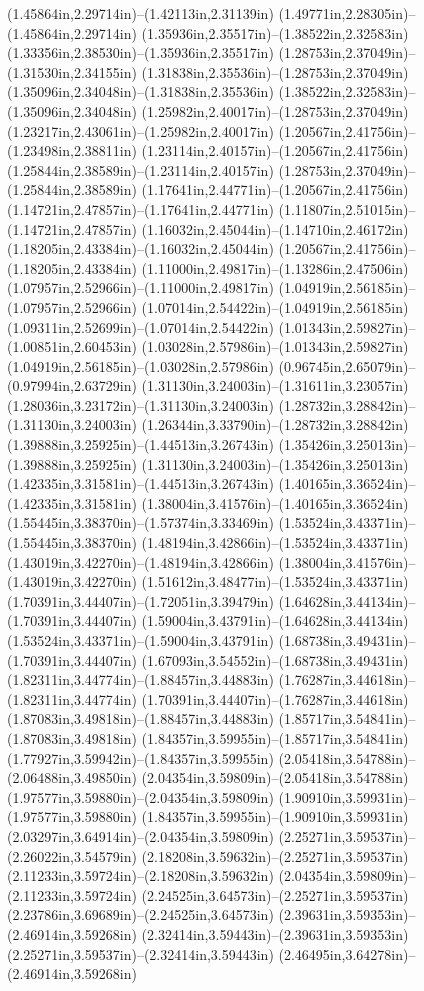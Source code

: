 (1.45864in,2.29714in)--(1.42113in,2.31139in) (1.49771in,2.28305in)--(1.45864in,2.29714in) (1.35936in,2.35517in)--(1.38522in,2.32583in) (1.33356in,2.38530in)--(1.35936in,2.35517in) (1.28753in,2.37049in)--(1.31530in,2.34155in) (1.31838in,2.35536in)--(1.28753in,2.37049in) (1.35096in,2.34048in)--(1.31838in,2.35536in) (1.38522in,2.32583in)--(1.35096in,2.34048in) (1.25982in,2.40017in)--(1.28753in,2.37049in) (1.23217in,2.43061in)--(1.25982in,2.40017in) (1.20567in,2.41756in)--(1.23498in,2.38811in) (1.23114in,2.40157in)--(1.20567in,2.41756in) (1.25844in,2.38589in)--(1.23114in,2.40157in) (1.28753in,2.37049in)--(1.25844in,2.38589in) (1.17641in,2.44771in)--(1.20567in,2.41756in) (1.14721in,2.47857in)--(1.17641in,2.44771in) (1.11807in,2.51015in)--(1.14721in,2.47857in) (1.16032in,2.45044in)--(1.14710in,2.46172in) (1.18205in,2.43384in)--(1.16032in,2.45044in) (1.20567in,2.41756in)--(1.18205in,2.43384in) (1.11000in,2.49817in)--(1.13286in,2.47506in) (1.07957in,2.52966in)--(1.11000in,2.49817in) (1.04919in,2.56185in)--(1.07957in,2.52966in) (1.07014in,2.54422in)--(1.04919in,2.56185in) (1.09311in,2.52699in)--(1.07014in,2.54422in) (1.01343in,2.59827in)--(1.00851in,2.60453in) (1.03028in,2.57986in)--(1.01343in,2.59827in) (1.04919in,2.56185in)--(1.03028in,2.57986in) (0.96745in,2.65079in)--(0.97994in,2.63729in) (1.31130in,3.24003in)--(1.31611in,3.23057in) (1.28036in,3.23172in)--(1.31130in,3.24003in) (1.28732in,3.28842in)--(1.31130in,3.24003in) (1.26344in,3.33790in)--(1.28732in,3.28842in) (1.39888in,3.25925in)--(1.44513in,3.26743in) (1.35426in,3.25013in)--(1.39888in,3.25925in) (1.31130in,3.24003in)--(1.35426in,3.25013in) (1.42335in,3.31581in)--(1.44513in,3.26743in) (1.40165in,3.36524in)--(1.42335in,3.31581in) (1.38004in,3.41576in)--(1.40165in,3.36524in) (1.55445in,3.38370in)--(1.57374in,3.33469in) (1.53524in,3.43371in)--(1.55445in,3.38370in) (1.48194in,3.42866in)--(1.53524in,3.43371in) (1.43019in,3.42270in)--(1.48194in,3.42866in) (1.38004in,3.41576in)--(1.43019in,3.42270in) (1.51612in,3.48477in)--(1.53524in,3.43371in) (1.70391in,3.44407in)--(1.72051in,3.39479in) (1.64628in,3.44134in)--(1.70391in,3.44407in) (1.59004in,3.43791in)--(1.64628in,3.44134in) (1.53524in,3.43371in)--(1.59004in,3.43791in) (1.68738in,3.49431in)--(1.70391in,3.44407in) (1.67093in,3.54552in)--(1.68738in,3.49431in) (1.82311in,3.44774in)--(1.88457in,3.44883in) (1.76287in,3.44618in)--(1.82311in,3.44774in) (1.70391in,3.44407in)--(1.76287in,3.44618in) (1.87083in,3.49818in)--(1.88457in,3.44883in) (1.85717in,3.54841in)--(1.87083in,3.49818in) (1.84357in,3.59955in)--(1.85717in,3.54841in) (1.77927in,3.59942in)--(1.84357in,3.59955in) (2.05418in,3.54788in)--(2.06488in,3.49850in) (2.04354in,3.59809in)--(2.05418in,3.54788in) (1.97577in,3.59880in)--(2.04354in,3.59809in) (1.90910in,3.59931in)--(1.97577in,3.59880in) (1.84357in,3.59955in)--(1.90910in,3.59931in) (2.03297in,3.64914in)--(2.04354in,3.59809in) (2.25271in,3.59537in)--(2.26022in,3.54579in) (2.18208in,3.59632in)--(2.25271in,3.59537in) (2.11233in,3.59724in)--(2.18208in,3.59632in) (2.04354in,3.59809in)--(2.11233in,3.59724in) (2.24525in,3.64573in)--(2.25271in,3.59537in) (2.23786in,3.69689in)--(2.24525in,3.64573in) (2.39631in,3.59353in)--(2.46914in,3.59268in) (2.32414in,3.59443in)--(2.39631in,3.59353in) (2.25271in,3.59537in)--(2.32414in,3.59443in) (2.46495in,3.64278in)--(2.46914in,3.59268in) 